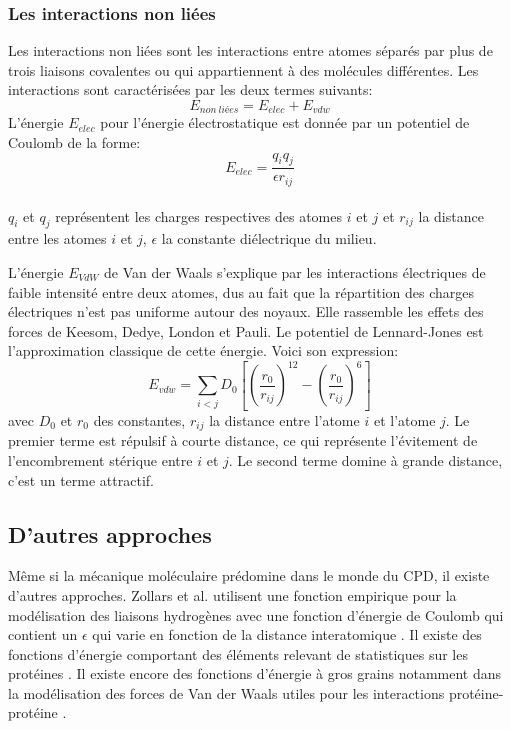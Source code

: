 \subsubsection{Les interactions non liées}
Les interactions non liées sont les interactions entre atomes séparés par plus de trois liaisons covalentes ou qui appartiennent à des molécules différentes. Les interactions sont caractérisées par les deux termes suivants:
\begin{equation}
E_{non\ liées} = E_{elec} + E_{vdw}  
\end{equation}
L'énergie $E_{elec}$ pour l'énergie électrostatique est donnée par un potentiel de Coulomb de la forme:
\begin{equation}
  E_{elec}=\frac{q_iq_j}{\epsilon r_{ij}}
\end{equation}\\
$q_i$ et $q_j$ représentent les charges respectives des atomes $i$ et $j$ et $r_{ij}$ la distance entre les atomes $i$ et $j$, $\epsilon$ la constante diélectrique du milieu.

L'énergie  $E_{VdW}$ de Van der Waals s'explique par les interactions électriques de faible intensité entre deux atomes, dus au fait que la répartition des charges électriques n'est pas uniforme autour des noyaux. Elle rassemble les effets des forces de Keesom, Dedye, London et Pauli. Le potentiel de Lennard-Jones est l'approximation classique de cette énergie. Voici son expression:
\begin{equation}
    \label{VdW}
E_{vdw} = \sum_{i<j}D_0 [(\frac{r_0}{r_{ij}})^{12} - (\frac{r_0}{r_{ij}})^6]  
\end{equation}
avec $D_0$ et $r_0$ des constantes, $r_{ij}$ la distance entre l'atome $i$ et l'atome $j$. Le premier terme est répulsif à courte distance, ce qui représente l'évitement de l'encombrement stérique entre $i$ et $j$. Le second terme domine à grande distance, c'est un terme attractif. 
  

\subsection{D'autres approches}

Même si la mécanique moléculaire prédomine dans le monde du CPD, il existe d'autres approches. Zollars et al. utilisent une fonction empirique pour la modélisation des liaisons hydrogènes avec une fonction d'énergie de Coulomb qui contient un $\epsilon$ qui varie en fonction de la distance interatomique \cite{Zollars06}. Il existe des fonctions d'énergie comportant des éléments relevant de statistiques sur les protéines \cite{Pokala05}. Il existe encore des fonctions d'énergie à gros grains notamment dans la modélisation des forces de Van der Waals utiles pour les interactions protéine-protéine \cite{Korkut09}.

